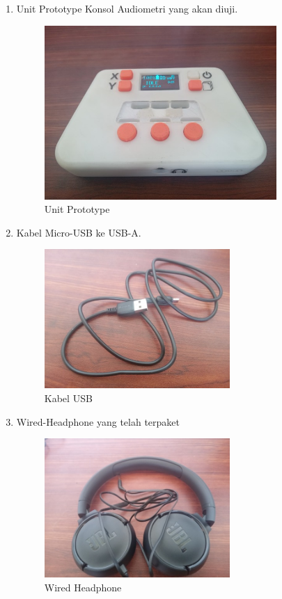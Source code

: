 \documentclass[12pt]{book}
\begin{document}
    \begin{enumerate}
		\item Unit Prototype Konsol Audiometri yang akan diuji.
		\begin{figure}[!ht]
			\centering
			\includegraphics[width=250pt]{images/unit/proto}
			\caption{Unit Prototype}
		\end{figure}

		\item Kabel Micro-USB ke USB-A.
		\begin{figure}[!ht]
			\centering
			\includegraphics[width=200pt]{images/unit/kabel}
			\caption{Kabel USB}
		\end{figure}

		\newpage
		\item Wired-Headphone yang telah terpaket
		\begin{figure}[!ht]
			\centering
			\includegraphics[width=200pt]{images/unit/jbl}
			\caption{Wired Headphone}
		\end{figure}


\end{enumerate}
\end{document}
